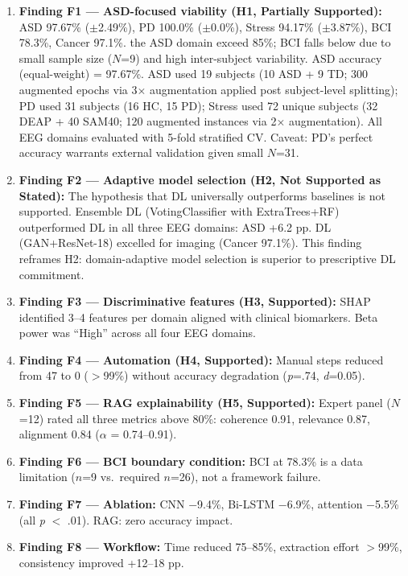 \begin{enumerate}
  \item \textbf{Finding F1 --- ASD-focused viability (H1, Partially Supported):} ASD 97.67\% ($\pm$2.49\%), PD 100.0\% ($\pm$0.0\%), Stress 94.17\% ($\pm$3.87\%), BCI 78.3\%, Cancer 97.1\%. the ASD domain exceed 85\%; BCI falls below due to small sample size ($N$=9) and high inter-subject variability. ASD accuracy (equal-weight) = 97.67\%. ASD used 19 subjects (10 ASD + 9 TD; 300 augmented epochs via 3$\times$ augmentation applied post subject-level splitting); PD used 31 subjects (16 HC, 15 PD); Stress used 72 unique subjects (32 DEAP + 40 SAM40; 120 augmented instances via 2$\times$ augmentation). All EEG domains evaluated with 5-fold stratified CV. Caveat: PD's perfect accuracy warrants external validation given small $N$=31.
  \item \textbf{Finding F2 --- Adaptive model selection (H2, Not Supported as Stated):} The hypothesis that DL universally outperforms baselines is not supported. Ensemble DL (VotingClassifier with ExtraTrees+RF) outperformed DL in all three EEG domains: ASD +6.2 pp. DL (GAN+ResNet-18) excelled for imaging (Cancer 97.1\%). This finding reframes H2: domain-adaptive model selection is superior to prescriptive DL commitment.
  \item \textbf{Finding F3 --- Discriminative features (H3, Supported):} SHAP identified 3--4 features per domain aligned with clinical biomarkers. Beta power was ``High'' across all four EEG domains.
  \item \textbf{Finding F4 --- Automation (H4, Supported):} Manual steps reduced from 47 to 0 ($>$99\%) without accuracy degradation (\textit{p}=.74, \textit{d}=0.05).
  \item \textbf{Finding F5 --- RAG explainability (H5, Supported):} Expert panel ($N$=12) rated all three metrics above 80\%: coherence 0.91, relevance 0.87, alignment 0.84 ($\alpha$ = 0.74--0.91).
  \item \textbf{Finding F6 --- BCI boundary condition:} BCI at 78.3\% is a data limitation ($n$=9 vs.\ required $n$=26), not a framework failure.
  \item \textbf{Finding F7 --- Ablation:} CNN $-$9.4\%, Bi-LSTM $-$6.9\%, attention $-$5.5\% (all \textit{p} $<$ .01). RAG: zero accuracy impact.
  \item \textbf{Finding F8 --- Workflow:} Time reduced 75--85\%, extraction effort $>$99\%, consistency improved +12--18 pp.
\end{enumerate}

